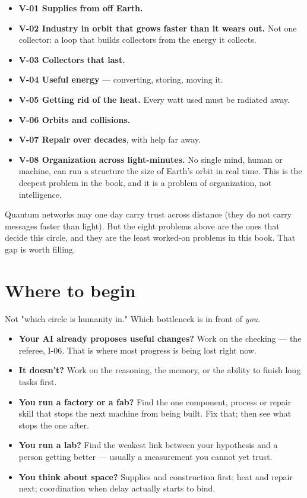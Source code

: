 \documentclass[11pt]{article}
\begin{document}
\begin{itemize}[leftmargin=1.4em,itemsep=2pt]
\item \textbf{V-01 Supplies from off Earth.}
\item \textbf{V-02 Industry in orbit that grows faster than it wears out.} Not one collector: a loop that builds collectors from the energy it collects.
\item \textbf{V-03 Collectors that last.}
\item \textbf{V-04 Useful energy} --- converting, storing, moving it.
\item \textbf{V-05 Getting rid of the heat.} Every watt used must be radiated away.
\item \textbf{V-06 Orbits and collisions.}
\item \textbf{V-07 Repair over decades}, with help far away.
\item \textbf{V-08 Organization across light-minutes.} No single mind, human or machine, can run a structure the size of Earth's orbit in real time. This is the deepest problem in the book, and it is a problem of organization, not intelligence.
\end{itemize}

Quantum networks may one day carry trust across distance (they do not carry messages faster than light). But the eight problems above are the ones that decide this circle, and they are the least worked-on problems in this book. That gap is worth filling.

\section*{Where to begin}

Not "which circle is humanity in." Which bottleneck is in front of \emph{you}.

\begin{itemize}[leftmargin=1.4em,itemsep=2pt]
\item \textbf{Your AI already proposes useful changes?} Work on the checking --- the referee, I-06. That is where most progress is being lost right now.
\item \textbf{It doesn't?} Work on the reasoning, the memory, or the ability to finish long tasks first.
\item \textbf{You run a factory or a fab?} Find the one component, process or repair skill that stops the next machine from being built. Fix that; then see what stops the one after.
\item \textbf{You run a lab?} Find the weakest link between your hypothesis and a person getting better --- usually a measurement you cannot yet trust.
\item \textbf{You think about space?} Supplies and construction first; heat and repair next; coordination when delay actually starts to bind.
\end{itemize}
\end{document}
